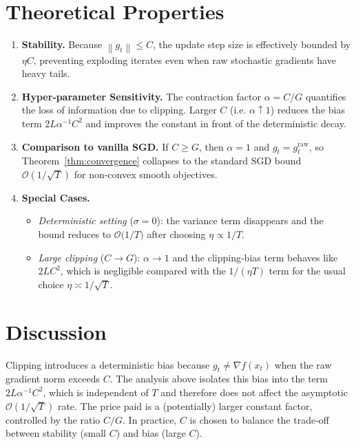 \documentclass{article}
\newcommand{\norm}[1]{\left\lVert#1\right\rVert}
\begin{document}
\section*{Theoretical Properties}
\begin{enumerate}[label=\arabic*.]
\item \textbf{Stability.} Because $\norm{g_{t}}\le C$, the update step size is effectively bounded by $\eta C$, preventing exploding iterates even when raw stochastic gradients have heavy tails.
\item \textbf{Hyper‑parameter Sensitivity.} The contraction factor $\alpha=C/G$ quantifies the loss of information due to clipping. Larger $C$ (i.e. $\alpha\!\uparrow\!1$) reduces the bias term $2L\alpha^{-1}C^{2}$ and improves the constant in front of the deterministic decay.
\item \textbf{Comparison to vanilla SGD.} If $C\ge G$, then $\alpha=1$ and $g_{t}=g^{\text{raw}}_{t}$, so Theorem~\ref{thm:convergence} collapses to the standard SGD bound $\mathcal{O}(1/\sqrt{T})$ for non‑convex smooth objectives.
\item \textbf{Special Cases.}
\begin{itemize}
\item \emph{Deterministic setting} ($\sigma=0$): the variance term disappears and the bound reduces to $ \mathcal{O}\!\bigl(1/T\bigr)$ after choosing $\eta\propto 1/T$.
\item \emph{Large clipping} ($C\to G$): $\alpha\to1$ and the clipping‑bias term behaves like $2LC^{2}$, which is negligible compared with the $1/(\eta T)$ term for the usual choice $\eta\asymp 1/\sqrt{T}$.
\end{itemize}
\end{enumerate}

\section*{Discussion}
Clipping introduces a deterministic bias because $g_{t}\neq\nabla f(x_{t})$ when the raw gradient norm exceeds $C$. The analysis above isolates this bias into the term $2L\alpha^{-1}C^{2}$, which is independent of $T$ and therefore does not affect the asymptotic $\mathcal{O}(1/\sqrt{T})$ rate. The price paid is a (potentially) larger constant factor, controlled by the ratio $C/G$. In practice, $C$ is chosen to balance the trade‑off between stability (small $C$) and bias (large $C$).

\newpage
\end{document}
